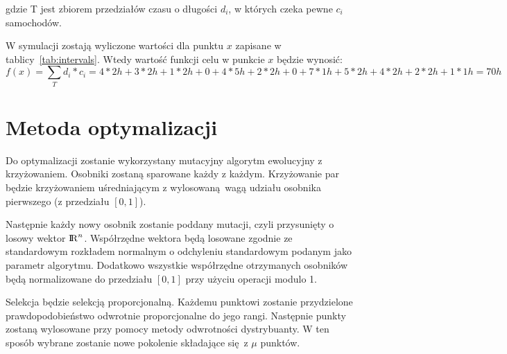\documentclass[a4paper]{article}
\begin{document}
gdzie T jest zbiorem przedziałów czasu o długości $d_i$, w których czeka pewne $c_i$
samochodów.

\begin{table}[ht]
    \centering
    \caption{Zbiór przedziałów czasowych $T$ wraz z ich długością $d_i$ oraz
    liczbą czekających samochodów $c_i$, dla punktu $x=(0.375, 0.625, 0.5)$\label{tab:intervals}.}
\end{table}

W symulacji zostają wyliczone wartości dla punktu $x$ zapisane w tablicy~\ref{tab:intervals}. 
Wtedy wartość funkcji celu w punkcie $x$ będzie wynosić:
$$f(x) = \sum\limits_{T} d_i * c_i = 4*2h + 3*2h + 1*2h + 0 + 4*5h + 2*2h + 0 + 7*1h + 5*2h + 4*2h + 2*2h + 1*1h = 70h $$

\section{Metoda optymalizacji}
Do optymalizacji zostanie wykorzystany mutacyjny algorytm ewolucyjny
z krzyżowaniem. Osobniki zostaną sparowane każdy z każdym. Krzyżowanie par będzie
krzyżowaniem uśredniającym z wylosowaną wagą udziału osobnika pierwszego
(z przedziału $[0, 1]$).

Następnie każdy nowy osobnik zostanie poddany mutacji,
czyli przysunięty o losowy wektor ${\rm I\!R}^n$. Współrzędne wektora będą
losowane zgodnie ze standardowym rozkładem normalnym o odchyleniu standardowym
podanym jako parametr algorytmu. Dodatkowo wszystkie współrzędne otrzymanych
osobników będą normalizowane do przedziału $[0, 1]$ przy użyciu operacji modulo 1.

Selekcja będzie selekcją proporcjonalną. Każdemu punktowi zostanie przydzielone
prawdopodobieństwo odwrotnie proporcjonalne do jego rangi. Następnie punkty
zostaną wylosowane przy pomocy metody odwrotności dystrybuanty. W ten sposób
wybrane zostanie nowe pokolenie składające się z $\mu$ punktów.
\end{document}
